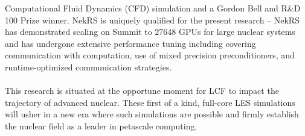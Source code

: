 \documentclass[11pt,letterpaper,english]{article}
\begin{document}
Computational Fluid Dynamics (CFD) simulation and a Gordon Bell and R\&D 100
Prize winner. NekRS is uniquely qualified for the present research -- NekRS has
demonstrated scaling on Summit to 27648 GPUs for large nuclear systems and
has undergone extensive performance tuning
 including covering communication with computation, use of mixed precision preconditioners,
 and runtime-optimized communication strategies.\\
 \\
 This research is situated at the opportune moment for LCF to
 impact the trajectory of advanced nuclear. These first of a kind, full-core LES simulations
 will usher in a new era where such simulations are possible
 and firmly establish the nuclear field as a leader in petascale computing.
\end{document}
